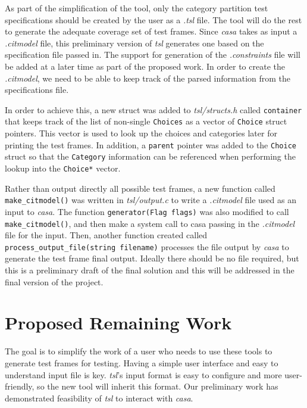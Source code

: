 \documentclass[a4full,12pt]{article}
\begin{document}
As part of the simplification of the tool, only the category partition test specifications
  should be created by the user as a \emph{.tsl} file. The tool will do the rest to
  generate the adequate coverage set of test frames. Since \emph{casa} takes as input a 
  \emph{.citmodel} file, this preliminary version of \emph{tsl} generates one based on the
  specification file passed in. The support for generation of the \emph{.constraints} file will be added
  at a later time as part of the proposed work. In order to create the \emph{.citmodel}, we need
  to be able to keep track of the parsed information from the specifications file.
  
In order to achieve this, a new struct was added to \emph{tsl/structs.h} called \texttt{container} that
  keeps track of the list of non-single \texttt{Choices} as a vector of \texttt{Choice} struct
  pointers. This vector is used to look up the choices and categories later for
  printing the test frames. In addition, a \texttt{parent} pointer was added to
  the \texttt{Choice }struct so that the \texttt{Category} information can be referenced when
  performing the lookup into the \texttt{Choice*} vector.
  
Rather than output directly all possible test frames, a new function called
  \texttt{make\_citmodel()} was written in \emph{tsl/output.c} to write a 
  \emph{.citmodel} file used as an input to \emph{casa}. The function
\texttt{generator(Flag flags)} was also modified to call \texttt{make\_citmodel()},
  and then make a system call to casa passing in the \emph{.citmodel} file for
  the input. Then, another function created  called
\texttt{process\_output\_file(string filename)} processes the file output by
  \emph{casa} to generate the test frame final output. Ideally there should be
  no file required, but this is a preliminary draft of the final solution
  and this will be addressed in the final version of the project.
  
  \section{Proposed Remaining Work}
The goal is to simplify the work of a user who needs to use these tools to generate test frames
  for testing. Having a simple user interface and easy to understand input file is key. \emph{tsl}'s
  input format is easy to configure and more user-friendly, so the new tool will inherit this format.
  Our preliminary work has demonstrated feasibility of \emph{tsl} to interact with \emph{casa}.
  
\end{document}
